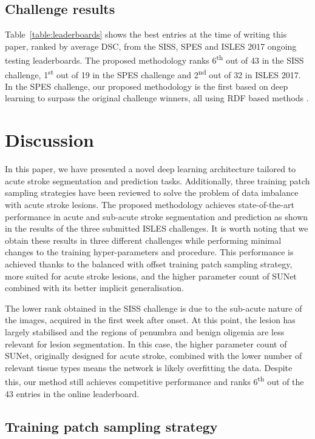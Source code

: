 \documentclass[letterpaper,final,authoryear,3p,times,twocolumn]{elsarticle}
\begin{document}
\subsection{Challenge results} 
Table~\ref{table:leaderboards} shows the best entries at the time of writing this paper, ranked by average DSC, from the SISS, SPES and ISLES 2017 ongoing testing leaderboards. The proposed methodology ranks 6\textsuperscript{th} out of 43 in the SISS challenge, 1\textsuperscript{st} out of 19 in the SPES challenge and 2\textsuperscript{nd} out of 32 in ISLES 2017. In the SPES challenge, our proposed methodology is the first based on deep learning to surpass the original challenge winners, all using RDF based methods \citep{Maier2017isles}.

\section{Discussion}
In this paper, we have presented a novel deep learning architecture tailored to acute stroke segmentation and prediction tasks. Additionally, three training patch sampling strategies have been reviewed to solve the problem of data imbalance with acute stroke lesions. The proposed methodology achieves state-of-the-art performance in acute and sub-acute stroke segmentation and prediction as shown in the results of the three submitted ISLES challenges. It is worth noting that we obtain these results in three different challenges while performing minimal changes to the training hyper-parameters and procedure. This performance is achieved thanks to the balanced with offset training patch sampling strategy, more suited for acute stroke lesions, and the higher parameter count of SUNet combined with its better implicit generalisation. 

The lower rank obtained in the SISS challenge is due to the sub-acute nature of the images, acquired in the first week after onset. At this point, the lesion has largely stabilised and the regions of penumbra and benign oligemia are less relevant for lesion segmentation. In this case, the higher parameter count of SUNet, originally designed for acute stroke, combined with the lower number of relevant tissue types means the network is likely overfitting the data. Despite this, our method still achieves competitive performance and ranks 6\textsuperscript{th} out of the 43 entries in the online leaderboard. 

\subsection{Training patch sampling strategy} %
\end{document}
